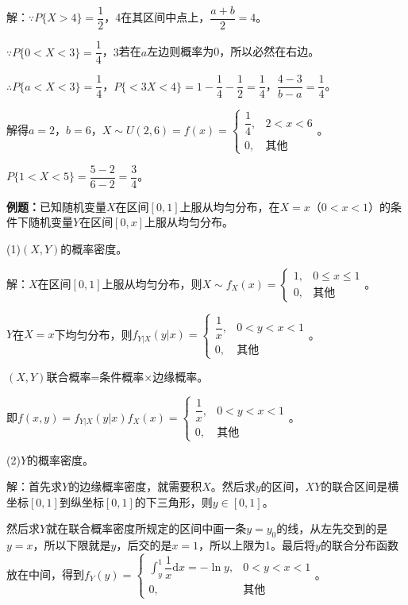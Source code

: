 \documentclass[UTF8, 12pt]{ctexart}
\begin{document}
解：$\because P\{X>4\}=\dfrac{1}{2}$，4在其区间中点上，$\dfrac{a+b}{2}=4$。

$\because P\{0<X<3\}=\dfrac{1}{4}$，$3$若在$a$左边则概率为0，所以必然在右边。

$\therefore P\{a<X<3\}=\dfrac{1}{4}$，$P\{<3X<4\}=1-\dfrac{1}{4}-\dfrac{1}{2}=\dfrac{1}{4}$，$\dfrac{4-3}{b-a}=\dfrac{1}{4}$。

解得$a=2$，$b=6$，$X\sim U(2,6)=f(x)=\left\{\begin{array}{ll}
    \dfrac{1}{4}, & 2<x<6 \\
    0, & \text{其他}
\end{array}\right.$。

$P\{1<X<5\}=\dfrac{5-2}{6-2}=\dfrac{3}{4}$。

\textbf{例题：}已知随机变量$X$在区间$[0,1]$上服从均匀分布，在$X=x$（$0<x<1$）的条件下随机变量$Y$在区间$[0,x]$上服从均匀分布。

(1)$(X,Y)$的概率密度。

解：$X$在区间$[0,1]$上服从均匀分布，则$X\sim f_X(x)=\left\{\begin{array}{ll}
    1, & 0\leqslant x\leqslant1 \\
    0, & \text{其他}
\end{array}\right.$。

$Y$在$X=x$下均匀分布，则$f_{Y|X}(y|x)=\left\{\begin{array}{ll}
    \dfrac{1}{x}, & 0<y<x<1 \\
    0, & \text{其他}
\end{array}\right.$。

$(X,Y)$联合概率=条件概率×边缘概率。

即$f(x,y)=f_{Y|X}(y|x)f_X(x)=\left\{\begin{array}{ll}
    \dfrac{1}{x}, & 0<y<x<1 \\
    0, & \text{其他}
\end{array}\right.$。

(2)$Y$的概率密度。

解：首先求$Y$的边缘概率密度，就需要积$X$。然后求$y$的区间，$XY$的联合区间是横坐标$[0,1]$到纵坐标$[0,1]$的下三角形，则$y\in[0,1]$。

然后求$Y$就在联合概率密度所规定的区间中画一条$y=y_0$的线，从左先交到的是$y=x$，所以下限就是$y$，后交的是$x=1$，所以上限为1。最后将$y$的联合分布函数放在中间，得到$f_Y(y)=\left\{\begin{array}{ll}
    \displaystyle{\int_y^1\dfrac{1}{x}\textrm{d}x}=-\ln y, & 0<y<x<1 \\
    0, & \text{其他}
\end{array}\right.$。
\end{document}
